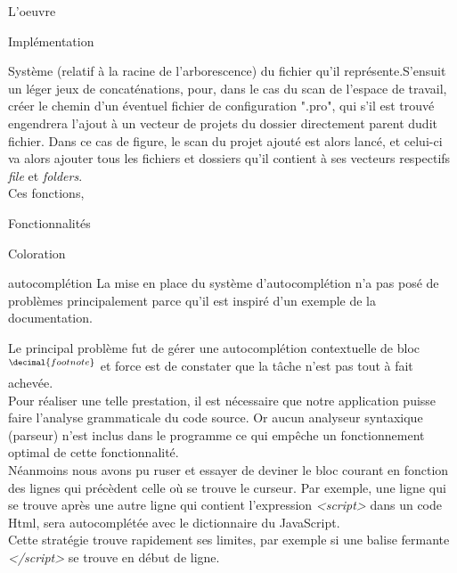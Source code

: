 \documentclass[a4paper, 12pt]{report}
\begin{document}
\begin{part}{L'oeuvre}
\begin{chapter}{Implémentation}
\begin{section}{Système}
				(relatif à la racine de l'arborescence) du fichier qu'il représente.S'ensuit un léger jeux de concaténations, pour, dans le cas du scan de l'espace de travail, créer le chemin d'un éventuel fichier
				de configuration ".pro", qui s'il est trouvé engendrera l'ajout à un vecteur de projets du dossier directement parent dudit fichier.
				Dans ce cas de figure, le scan du projet ajouté est alors lancé, et celui-ci va alors ajouter tous les fichiers et dossiers qu'il contient à ses vecteurs respectifs \emph{file} et \emph{folders}.\\
				Ces fonctions, %

			\end{section}
			\begin{section}{Fonctionnalités}
				\begin{subsection}{Coloration}
				\end{subsection}
				\begin{subsection}{\Gls{autocomplétion}}
				\label{autocompl}
					La mise en place du système d'autocomplétion n'a pas posé de problèmes principalement parce qu'il est inspiré d'un exemple de
					la documentation.\\

					\addtocounter{footnote}{3}
					\footnotetext[\value{footnote}]{le bloc désigne un morceau de code inclus dans un autre morceau de code.}
					Le principal problème fut de gérer une \gls{autocomplétion} contextuelle de bloc$^{\decimal{footnote}}$
					et force est de constater que la tâche n'est pas tout à fait achevée.\\
					Pour réaliser une telle prestation, il est nécessaire que notre application puisse faire l'analyse
					grammaticale du code source. Or aucun analyseur syntaxique (\gls{parseur}) n'est inclus dans le programme ce qui empêche
					un fonctionnement optimal de cette fonctionnalité.\\


					Néanmoins nous avons pu ruser et essayer de deviner le bloc courant en fonction des lignes qui précèdent celle où se
					trouve le curseur. Par exemple, une ligne qui se trouve après une autre ligne qui contient l'expression \emph{<script>}
					dans un code \gls{Html}, sera autocomplétée avec le dictionnaire du \gls{JavaScript}.\\
					Cette stratégie trouve rapidement ses limites, par exemple si une balise fermante \emph{</script>} se trouve en début
					de ligne.\\



\end{subsection}
\end{section}
\end{chapter}
\end{part}
\end{document}
